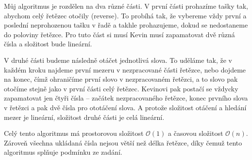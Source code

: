 \documentclass{fkssolpub}
\author{Ondřej Sedláček}
\begin{document}
Můj algoritmus je rozdělen na dva různé části. V první části prohazíme tašky
tak, abychom celý řetězec otočily (reverse). To probíhá tak, že vybereme vždy první a poslední
neprohozenou tašku v řadě a takhle prohazujeme, dokud se nedostaneme do poloviny
řetězce. Pro tuto část si musí Kevin musí zapamatovat dvě různá čísla a složitost
bude lineární.

V druhé části budeme následně otáčet jednotlivá slova. To uděláme tak, že v každém
kroku najdeme první mezeru v nezpracované části řetězce, nebo dojdeme na konec, 
čímž ohraničíme první slovo v nezpracovaném řetězci, a to slovo pak otočíme stejně
jako v první části celý řetězec. Kevinovi pak postačí se vždycky zapamatovat
jen čtyři čísla -- začátek nezpracovaného řetězce, konec prvního slova v řetězci
a pak dvě čísla pro ototáčení slova. A protože složitost otáčení a hledání mezer je 
lineární, složitost druhé části je celá lineární.

Celý tento algoritmus má prostorovou složitost $\mathcal{O}(1)$ a časovou
složitost $\mathcal{O}(n)$. Zároveň všechna ukládaná čísla nejsou větší než délka
řetězce, díky čemuž tento algoritmus splňuje podmínku ze zadání.

  
\end{document}
